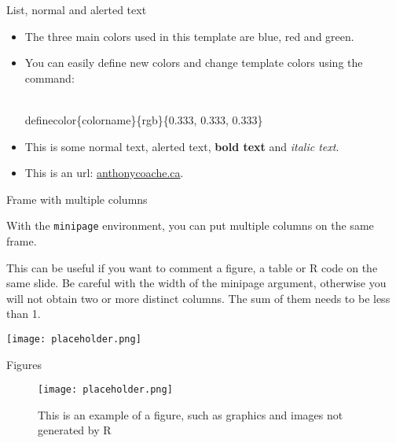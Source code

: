 \documentclass{beamer}
\begin{document}
\begin{frame}[fragile]{List, normal and alerted text}

\begin{itemize}
\setlength{\itemsep}{15pt}
\item The three main colors used in this template are \textcolor{mblue}{blue}, \textcolor{mred}{red} and \textcolor{mgreen}{green}. \\
\item You can easily define new colors and change template colors using the command: \begin{semiverbatim}\\definecolor\{colorname\}\{rgb\}\{0.333, 0.333, 0.333\}\end{semiverbatim}
\item This is some normal text, \alert{alerted text}, \textbf{bold text} and \textit{italic text}. \\
\item This is an url: \href{http://www.anthonycoache.ca}{anthonycoache.ca}.
\end{itemize}

\end{frame}


\begin{frame}{Frame with multiple columns}

\begin{minipage}[t]{0.3\linewidth}
	
	With the \texttt{minipage} environment, you can put multiple columns on the same frame.
	
\end{minipage}
\hfill
\begin{minipage}[t]{0.66\linewidth}
	
	This can be useful if you want to comment a figure, a table or R code on the same slide. Be careful with the width of the minipage argument, otherwise you will not obtain two or more distinct columns. The sum of them needs to be less than 1.
	
	\vspace*{0.25cm}
	
	\centerline{\texttt{[image: placeholder.png]}}
	
	
\end{minipage}

\end{frame}


\begin{frame}{Figures}

\begin{figure}
\caption{This is an example of a figure, such as graphics and images not generated by R}
\centerline{\texttt{[image: placeholder.png]}}
\end{figure}

\end{frame}
\end{document}
